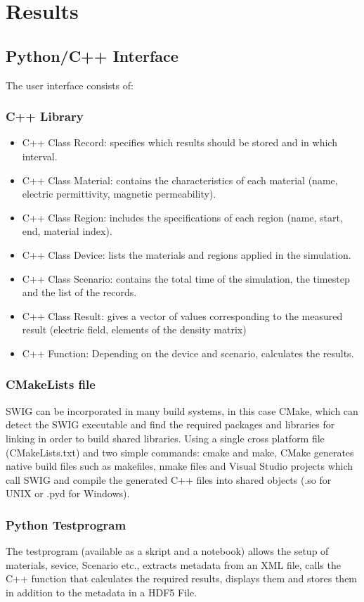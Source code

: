 \chapter{Results}
\label{chapter:results}
\section{Python/C++ Interface}
The user interface consists of:
\subsection{C++ Library} 
\begin{itemize}
\item C++ Class Record: specifies which results should be stored and in which interval.
\item C++ Class Material: contains the characteristics of each material (name, electric permittivity, magnetic permeability).
\item C++ Class Region: includes the specifications of each region (name, start, end, material index).
\item C++ Class Device: lists the materials and regions applied in the simulation.
\item C++ Class Scenario: contains the total time of the simulation, the timestep and the list of the records.
\item C++ Class Result: gives a vector of values corresponding to the measured result (electric field, elements of the density matrix)
\item C++ Function: Depending on the device and scenario, calculates the results.
\end{itemize}

\subsection{CMakeLists file}
SWIG can be incorporated in many build systems, in this case CMake, which can detect the SWIG executable and find the required packages and libraries for linking in order to build shared libraries. Using a single cross platform file (CMakeLists.txt) and two simple commands: cmake and make, CMake generates native build files such as makefiles, nmake files and Visual Studio projects which call SWIG and compile the generated C++ files into shared objects (.so for UNIX or .pyd for Windows).

\subsection{Python Testprogram}
The testprogram (available as a skript and a notebook) allows the setup of materials, sevice, Scenario etc., extracts metadata from an XML file, calls the C++ function that calculates the required results, displays them and  stores them in addition to the metadata in a HDF5 File.

